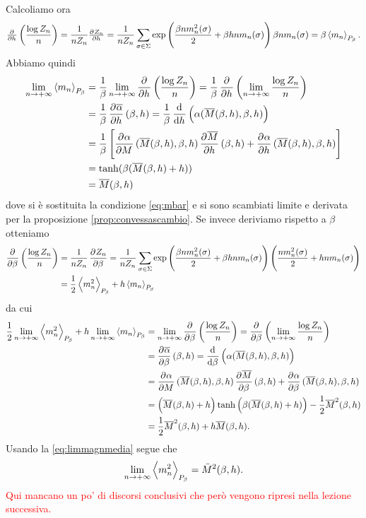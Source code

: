 Calcoliamo ora
\[ \pd{}{h}\left(\frac{\log Z_n}{n}\right) = \frac{1}{n Z_n} \pd{Z_n}{h} = \frac{1}{nZ_n}\sum_{\sigma \in \Sigma} \exp\left( \frac{\beta n m_n^2(\sigma)}{2} + \beta h n m_n(\sigma) \right) \beta n m_n(\sigma) = \beta \mean{m_n}_{P_\beta}. \]
Abbiamo quindi
\begin{align}
	\label{eq:limmagnmedia}
    \lim_{n \to +\infty}\mean{m_n}_{P_\beta} & = \frac{1}{\beta} \lim_{n \to +\infty} \dpd{}{h}\left(\frac{\log Z_n}{n}\right) = \frac{1}{\beta} \dpd{}{h} \left( \lim_{n \to +\infty} \frac{\log Z_n}{n} \right) \nonumber \\
	                                         & = \frac{1}{\beta} \dpd{\overline{\alpha}}{h}(\beta, h) = \frac{1}{\beta} \dod{}{h} \left( \alpha(\overline{M}(\beta,h), \beta, h)\right) \nonumber \\
                                             & = \frac{1}{\beta} \left[ \dpd{\alpha}{M}(\overline{M}(\beta,h),\beta,h) \dpd{\overline{M}}{h}(\beta,h) + \dpd{\alpha}{h}(\overline{M}(\beta,h),\beta,h) \right] \nonumber \\
                                             & = \tanh(\beta(\overline{M}(\beta,h)+h))  \nonumber \\
                                             & = \overline{M}(\beta, h)
\end{align}
dove si è sostituita la condizione \eqref{eq:mbar} e si sono scambiati limite e derivata per la proposizione \ref{prop:convessascambio}. Se invece deriviamo rispetto a $ \beta $ otteniamo
\begin{align*}
    \dpd{}{\beta} \left(\frac{\log Z_n}{n}\right) &= \frac{1}{n Z_n} \dpd{Z_n}{\beta} = \frac{1}{n Z_n} \sum_{\sigma \in \Sigma} \exp\left( \frac{\beta n m_n^2(\sigma)}{2} + \beta h n m_n(\sigma) \right) \left( \frac{n m_n^2(\sigma)}{2} + hnm_n(\sigma) \right) \\ &= \frac{1}{2} \mean{m_n^2}_{P_\beta} + h \mean{m_n}_{P_\beta}
\end{align*}
da cui
\begin{align*}
	\frac{1}{2}\lim_{n \to +\infty}\mean{m_n^2}_{P_\beta} + h\lim_{n \to +\infty}\mean{m_n}_{P_\beta}& = \lim_{n \to +\infty} \dpd{}{\beta} \left(\frac{\log Z_n}{n}\right) = \dpd{}{\beta} \left( \lim_{n \to +\infty}\frac{\log Z_n}{n} \right) \\
                                               & = \dpd{\overline{\alpha}}{\beta}(\beta,h) = \dod{}{\beta}\left(\alpha(\overline{M}(\beta,h),\beta,h)\right) \\
                                               & = \dpd{\alpha}{M}(\overline{M}(\beta,h),\beta,h) \dpd{\overline{M}}{\beta}(\beta,h) + \dpd{\alpha}{\beta}(\overline{M}(\beta,h),\beta,h) \\
                                               & = \left(\overline{M}(\beta,h) + h\right) \tanh\left(\beta(\overline{M}(\beta,h)+ h)\right) - \frac{1}{2}\overline{M}^2(\beta,h)\\
                                               & = \frac{1}{2}\overline{M}^2(\beta,h) + h \overline{M}(\beta,h).
\end{align*}
Usando la \ref{eq:limmagnmedia} segue che
\[ \lim_{n \to +\infty} \left< m_n^2 \right>_{P_\beta} = \bar{M}^2(\beta,h). \]
\textcolor{red}{Qui mancano un po' di discorsi conclusivi che però vengono ripresi nella lezione successiva.}
